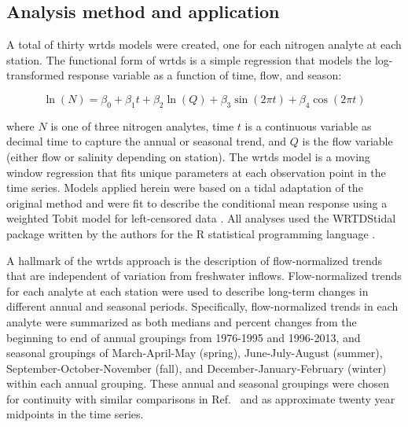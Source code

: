 \documentclass[journal = esthag, manuscript = article]{achemso}\usepackage[]{graphicx}\usepackage[]{color}
\begin{document}
\subsection{Analysis method and application}

A total of thirty \ac{wrtds} models were created, one for each nitrogen analyte at each station.  The functional form of \ac{wrtds} is a simple regression\cite{Hirsch10} that models the log-transformed response variable as a function of time, flow, and season:

\begin{equation}
\ln\left(N\right) = \beta_0 + \beta_1 t + \beta_2 \ln\left(Q\right) + \beta_3 \sin\left(2\pi t\right) + \beta_4 \cos\left(2\pi t\right)
\end{equation}  

\noindent where $N$ is one of three nitrogen analytes, time $t$ is a continuous variable as decimal time to capture the annual or seasonal trend, and $Q$ is the flow variable (either flow or salinity depending on station).  The \ac{wrtds} model is a moving window regression that fits unique parameters at each observation point in the time series.  Models applied herein were based on a tidal adaptation of the original method\cite{Beck15} and were fit to describe the conditional mean response using a weighted Tobit model for left-censored data \cite{Tobin58}. All analyses used the WRTDStidal package written by the authors for the R statistical programming language \cite{Beck16b,RDCT16}.

A hallmark of the \ac{wrtds} approach is the description of flow-normalized trends that are independent of variation from freshwater inflows. Flow-normalized trends for each analyte at each station were used to describe long-term changes in different annual and seasonal periods.  Specifically, flow-normalized trends in each analyte were summarized as both medians and percent changes from the beginning to end of annual groupings from 1976-1995 and 1996-2013, and seasonal groupings of March-April-May (spring), June-July-August (summer), September-October-November (fall), and December-January-February (winter) within each annual grouping. These annual and seasonal groupings were chosen for continuity with similar comparisons in Ref.~ and as approximate twenty year midpoints in the time series.  
\end{document}
